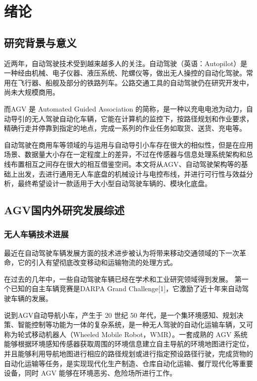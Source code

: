 \newpage
\section{绪论}
\subsection{研究背景与意义}

近两年，自动驾驶技术受到越来越多人的关注。自动驾驶（英语：Autopilot）是一种经由机械、电子仪器、液压系统、陀螺仪等，做出无人操控的自动化驾驶。常用在飞行器、船舰及部分的铁路列车。公路交通工具的自动驾驶仍在研究开发中，尚未大规模商用。

而AGV 是 Automated Guided Association 的简称，是一种以充电电池为动力，自动导引的无人驾驶自动化车辆，它能在计算机的监控下，按路径规划和作业要求，精确行走并停靠到指定的地点，完成一系列的作业任务如取货、送货、充电等。

自动驾驶在商用车等领域的与运用与自动导引小车存在很大的相似性，但是在应用场景、数据量大小存在一定程度上的差异，不过在传感器与信息处理系统架构和总线布置相互之间存在很大的相互借鉴空间。本文将从AGV、自动驾驶架构等的基础上出发，去进行通用无人车底盘的机械设计与电控布线，并进行可行性与效益分析，最终希望设计一款适用于大小型自动驾驶车辆的、模块化底盘。

\subsection{AGV国内外研究发展综述}

\subsubsection{无人车辆技术进展}

最近在自动驾驶车辆发展方面的技术进步被认为将带来移动交通领域的下一次革命，它的引入有望彻底改变移动和运输物流的处理方式。

在过去的几年中，一些自动驾驶车辆已经在学术和工业研究领域得到发展。 第一个已知的自主车辆竞赛是DARPA Grand Challenge[1]，它激励了近十年来自动驾驶车辆的发展。

说到AGV自动导航小车，产生于 20 世纪 50 年代，是一个集环境感知、规划决策、智能控制等功能为一体的复杂系统，是一种无人驾驶的自动化运输车辆，又可称为轮式移动机器人（Wheeled Mobile Robot，WMR）。一套成熟的 AGV 系统能够根据环境感知传感器获取周围的环境信息建立自主导航的环境地图进行定位，并且能够利用导航地图进行相应的路径规划或进行指定预设路径行驶，完成货物的自动化运输等任务，是实现现代化生产制造、仓库自动化运输、餐厅现代化等重要设备，同时 AGV 能够在环境恶劣、危险场所进行工作。

